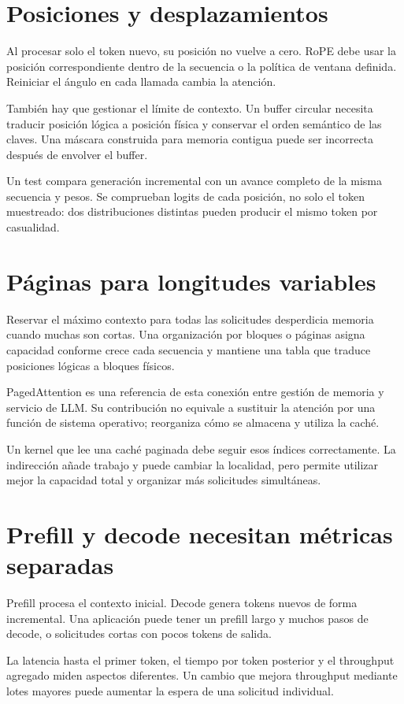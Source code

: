 \documentclass[12pt,a4paper,oneside]{report}
\begin{document}
\section{Posiciones y desplazamientos}
Al procesar solo el token nuevo, su posición no vuelve a cero. RoPE debe usar la posición correspondiente dentro de la secuencia o la política de ventana definida. Reiniciar el ángulo en cada llamada cambia la atención.

También hay que gestionar el límite de contexto. Un buffer circular necesita traducir posición lógica a posición física y conservar el orden semántico de las claves. Una máscara construida para memoria contigua puede ser incorrecta después de envolver el buffer.

Un test compara generación incremental con un avance completo de la misma secuencia y pesos. Se comprueban logits de cada posición, no solo el token muestreado: dos distribuciones distintas pueden producir el mismo token por casualidad.

\section{Páginas para longitudes variables}
Reservar el máximo contexto para todas las solicitudes desperdicia memoria cuando muchas son cortas. Una organización por bloques o páginas asigna capacidad conforme crece cada secuencia y mantiene una tabla que traduce posiciones lógicas a bloques físicos.

PagedAttention es una referencia de esta conexión entre gestión de memoria y servicio de LLM. Su contribución no equivale a sustituir la atención por una función de sistema operativo; reorganiza cómo se almacena y utiliza la caché. \cite{paged}

Un kernel que lee una caché paginada debe seguir esos índices correctamente. La indirección añade trabajo y puede cambiar la localidad, pero permite utilizar mejor la capacidad total y organizar más solicitudes simultáneas.

\section{Prefill y decode necesitan métricas separadas}
Prefill procesa el contexto inicial. Decode genera tokens nuevos de forma incremental. Una aplicación puede tener un prefill largo y muchos pasos de decode, o solicitudes cortas con pocos tokens de salida.

La latencia hasta el primer token, el tiempo por token posterior y el throughput agregado miden aspectos diferentes. Un cambio que mejora throughput mediante lotes mayores puede aumentar la espera de una solicitud individual.
\end{document}
